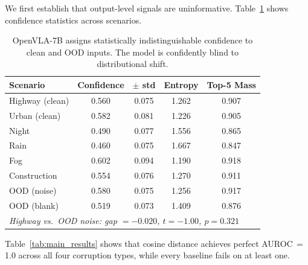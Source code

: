 \documentclass[11pt]{article}
\begin{document}
We first establish that output-level signals are uninformative.
Table~\ref{tab:confidence} shows confidence statistics across scenarios.

\begin{table}[t]
\centering
\caption{OpenVLA-7B assigns statistically indistinguishable confidence to clean and OOD inputs. The model is confidently blind to distributional shift.}
\label{tab:confidence}
\small
\begin{tabular}{lcccc}
\toprule
\textbf{Scenario} & \textbf{Confidence} & \textbf{$\pm$ std} & \textbf{Entropy} & \textbf{Top-5 Mass} \\
\midrule
Highway (clean) & 0.560 & 0.075 & 1.262 & 0.907 \\
Urban (clean) & 0.582 & 0.081 & 1.226 & 0.905 \\
Night & 0.490 & 0.077 & 1.556 & 0.865 \\
Rain & 0.460 & 0.075 & 1.667 & 0.847 \\
Fog & 0.602 & 0.094 & 1.190 & 0.918 \\
Construction & 0.554 & 0.076 & 1.270 & 0.911 \\
OOD (noise) & 0.580 & 0.075 & 1.256 & 0.917 \\
OOD (blank) & 0.519 & 0.073 & 1.409 & 0.876 \\
\midrule
\multicolumn{5}{l}{\textit{Highway vs.\ OOD noise: gap $= -0.020$, $t = -1.00$, $p = 0.321$}} \\
\bottomrule
\end{tabular}
\end{table}

Table~\ref{tab:main_results} shows that cosine distance achieves perfect AUROC\,$=$\,1.0 across all four corruption types, while every baseline fails on at least one.
\end{document}

